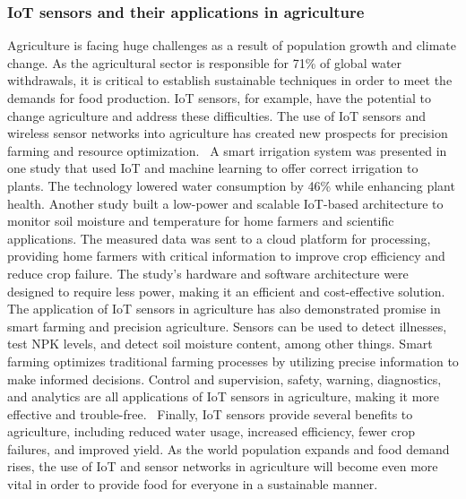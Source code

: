 \documentclass[11pt]{scrartcl} %
\begin{document}
\subsubsection{IoT sensors and their applications in agriculture}
Agriculture is facing huge challenges as a result of population growth and climate change. As the agricultural sector is responsible for 71\% of global water withdrawals, it is critical to establish sustainable techniques in order to meet the demands for food production. IoT sensors, for example, have the potential to change agriculture and address these difficulties. The use of IoT sensors and wireless sensor networks into agriculture has created new prospects for precision farming and resource optimization.~\parencite{capacitive_sensors_for_irrigation_and_disease, worldwide_water_withdrawals}
\newline A smart irrigation system was presented in one study that used IoT and machine learning to offer correct irrigation to plants. The technology lowered water consumption by 46\% while enhancing plant health. Another study built a low-power and scalable IoT-based architecture to monitor soil moisture and temperature for home farmers and scientific applications. The measured data was sent to a cloud platform for processing, providing home farmers with critical information to improve crop efficiency and reduce crop failure. The study's hardware and software architecture were designed to require less power, making it an efficient and cost-effective solution.~\parencites{precision_irrigation_iot}{capacitive_sensors_for_irrigation_and_disease}
\newline The application of IoT sensors in agriculture has also demonstrated promise in smart farming and precision agriculture. Sensors can be used to detect illnesses, test NPK levels, and detect soil moisture content, among other things. Smart farming optimizes traditional farming processes by utilizing precise information to make informed decisions. Control and supervision, safety, warning, diagnostics, and analytics are all applications of IoT sensors in agriculture, making it more effective and trouble-free.~\parencite{iot_and_sensors_in_agriculture_general}
\newline Finally, IoT sensors provide several benefits to agriculture, including reduced water usage, increased efficiency, fewer crop failures, and improved yield. As the world population expands and food demand rises, the use of IoT and sensor networks in agriculture will become even more vital in order to provide food for everyone in a sustainable manner.\parencite{capacitive_sensors_for_irrigation_and_disease,bwambale2022smart}
\end{document}
